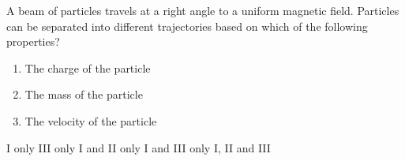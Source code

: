 \begin{questions}\setcounter{question}{13}\question
A beam of particles travels at a right angle to a uniform magnetic field. Particles can be separated into different trajectories based on which of the following properties?

\begin{enumerate}
    \item The charge of the particle
    \item The mass of the particle
    \item The velocity of the particle
\end{enumerate}

\begin{oneparchoices}
\choice I only
\choice III only
\choice I and II only
\choice I and III only
\choice I, II and III
\end{oneparchoices}\end{questions}

